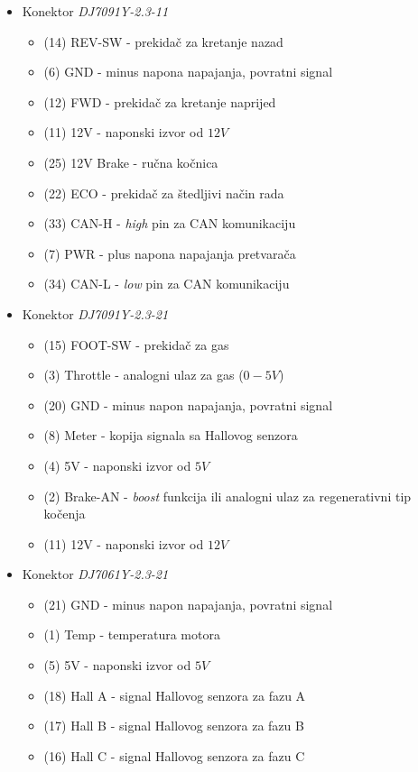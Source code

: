 \begin{itemize}
	\item Konektor \textit{DJ7091Y-2.3-11}
	\begin{itemize}
		\item (14) REV-SW - prekidač za kretanje nazad
		\item  (6) GND - minus napona napajanja, povratni signal
		\item (12) FWD - prekidač za kretanje naprijed
		\item (11) 12V - naponski izvor od $12V$
		\item (25) 12V Brake - ručna kočnica
		\item (22) ECO - prekidač za štedljivi način rada
		\item (33) CAN-H - \textit{high} pin za CAN komunikaciju
		\item  (7) PWR - plus napona napajanja pretvarača
		\item (34) CAN-L - \textit{low} pin za CAN komunikaciju
	\end{itemize}
	\item Konektor \textit{DJ7091Y-2.3-21}
		\begin{itemize}
		\item (15) FOOT-SW - prekidač za gas
		\item  (3) Throttle - analogni ulaz za gas ($0-5V$)
		\item (20) GND - minus napon napajanja, povratni signal
		\item  (8) Meter - kopija signala sa Hallovog senzora
		\item  (4) 5V - naponski izvor od $5V$
		\item  (2) Brake-AN - \textit{boost} funkcija ili analogni ulaz za regenerativni tip kočenja
		\item (11) 12V - naponski izvor od $12V$
	\end{itemize}
	\item Konektor \textit{DJ7061Y-2.3-21}
		\begin{itemize}
		\item (21) GND - minus napon napajanja, povratni signal
		\item  (1) Temp - temperatura motora
		\item  (5) 5V - naponski izvor od $5V$
		\item (18) Hall A - signal Hallovog senzora za fazu A
		\item (17) Hall B - signal Hallovog senzora za fazu B 
		\item (16) Hall C - signal Hallovog senzora za fazu C 
	\end{itemize}
\end{itemize}

